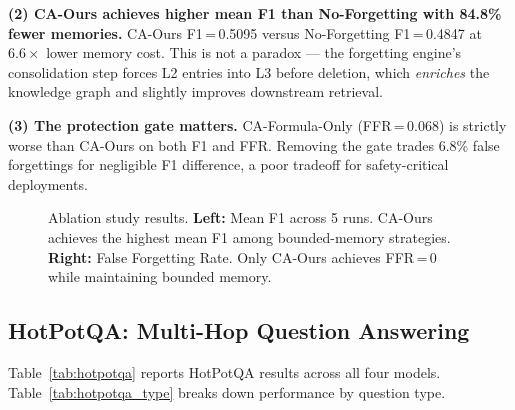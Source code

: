 \documentclass{article}
\begin{document}
\textbf{(2) CA-Ours achieves higher mean F1 than No-Forgetting with 84.8\% fewer
memories.}  CA-Ours F1\,=\,0.5095 versus No-Forgetting F1\,=\,0.4847 at $6.6\times$
lower memory cost.  This is not a paradox — the forgetting engine's consolidation
step forces L2 entries into L3 before deletion, which \emph{enriches} the
knowledge graph and slightly improves downstream retrieval.

\textbf{(3) The protection gate matters.}  CA-Formula-Only (FFR\,=\,0.068) is
strictly worse than CA-Ours on both F1 and FFR.  Removing the gate trades
6.8\% false forgettings for negligible F1 difference, a poor tradeoff for
safety-critical deployments.

\begin{figure}[h]
\centering
{}
\caption{Ablation study results.  \textbf{Left:} Mean F1 across 5 runs.  CA-Ours achieves
  the highest mean F1 among bounded-memory strategies.  \textbf{Right:} False Forgetting Rate.
  Only CA-Ours achieves FFR\,=\,0 while maintaining bounded memory.}
\label{fig:ablation}
\end{figure}

\subsection{HotPotQA: Multi-Hop Question Answering}
\label{sec:hotpotqa}

Table~\ref{tab:hotpotqa} reports HotPotQA results across all four models.
Table~\ref{tab:hotpotqa_type} breaks down performance by question type.
\end{document}
